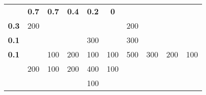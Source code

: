     \begin{tabular}{cccccccccc}
            & \textcolor[rgb]{ 1,  0,  0}{\textbf{0.7}} & \textcolor[rgb]{ 1,  0,  0}{\textbf{0.7}} & \textcolor[rgb]{ 1,  0,  0}{\textbf{0.4}} & \textcolor[rgb]{ 1,  0,  0}{\textbf{0.2}} & \textcolor[rgb]{ 1,  0,  0}{\textbf{0}} &         &         &         &  \bigstrut[b]\\
\cline{2-6}    \multicolumn{1}{c|}{\textcolor[rgb]{ 1,  0,  0}{\textbf{0.3}}} & \multicolumn{1}{c|}{200} & \multicolumn{1}{c|}{} & \multicolumn{1}{c|}{} & \multicolumn{1}{c|}{} & \multicolumn{1}{c|}{} & 200     &         &         &  \bigstrut\\
\cline{2-6}    \multicolumn{1}{c|}{\textcolor[rgb]{ 1,  0,  0}{\textbf{0.1}}} & \multicolumn{1}{c|}{} & \multicolumn{1}{c|}{} & \multicolumn{1}{c|}{} & \multicolumn{1}{c|}{300} & \multicolumn{1}{c|}{} & 300     &         &         &  \bigstrut\\
\cline{2-6}    \multicolumn{1}{c|}{\textcolor[rgb]{ 1,  0,  0}{\textbf{0.1}}} & \multicolumn{1}{c|}{} & \multicolumn{1}{c|}{100} & \multicolumn{1}{c|}{200} & \multicolumn{1}{c|}{100} & \multicolumn{1}{c|}{100} & 500     & 300     & 200     & 100 \bigstrut\\
\cline{2-6}            & 200     & 100     & 200     & 400     & 100     &         &         &         &  \bigstrut[t]\\
            &         &         &         & 100     &         &         &         &         &  \\
    \end{tabular}%
